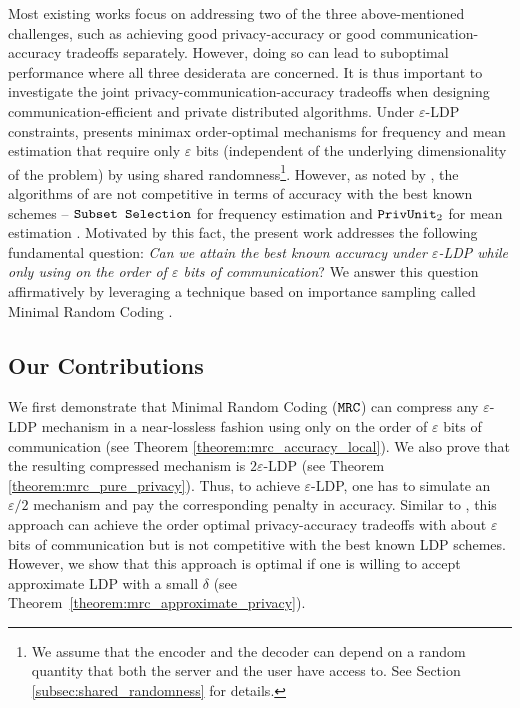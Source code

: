 Most existing works focus on addressing two of the three above-mentioned challenges, such as achieving good privacy-accuracy or good communication-accuracy tradeoffs separately. However, doing so can lead to suboptimal performance where all three desiderata are concerned. It is thus important to investigate the joint privacy-communication-accuracy tradeoffs when designing communication-efficient and private distributed algorithms. Under $\varepsilon$-LDP constraints, \cite{CKO20} presents minimax order-optimal mechanisms for frequency and mean estimation that require only $\varepsilon$ bits (independent of the underlying dimensionality of the problem) by using shared randomness\footnote{We assume that the encoder and the decoder can depend on a random quantity that both the server and the user have access to. See Section \ref{subsec:shared_randomness} for details.}.
However,  as noted by \cite{FT21}, the algorithms of \cite{CKO20} are not competitive in terms of accuracy with the best known schemes -- $\texttt{Subset Selection}$ for frequency estimation \citep{YB18} and $\texttt{PrivUnit}_2$ for mean estimation \citep{BDFKR2018}.
Motivated by this fact, the present work addresses the following fundamental question: \emph{Can we attain the best known accuracy under $\varepsilon$-LDP while only using on the order of $\varepsilon$ bits of communication}? We answer this question affirmatively by leveraging a technique based on importance sampling called Minimal Random Coding \citep{HPHJ19,C08,SCV16}. 

\subsection{Our Contributions}
\label{subsec:contributions}
We first demonstrate that Minimal Random Coding ($\texttt{MRC}$) can compress any $\varepsilon$-LDP mechanism in a near-lossless fashion using only on the order of $\varepsilon$ bits of communication (see Theorem \ref{theorem:mrc_accuracy_local}). We also prove that the resulting compressed mechanism is $2\varepsilon$-LDP (see Theorem \ref{theorem:mrc_pure_privacy}).
Thus, to achieve $\varepsilon$-LDP, one has to simulate an $\varepsilon/2$ mechanism and pay the corresponding penalty in accuracy. 
Similar to \cite{CKO20}, this approach can achieve the order optimal privacy-accuracy tradeoffs with about $\varepsilon$ bits of communication but is not competitive with the best known LDP schemes. However, we show that this approach is optimal if one is willing to accept approximate LDP with a small $\delta$ (see Theorem~\ref{theorem:mrc_approximate_privacy}).

